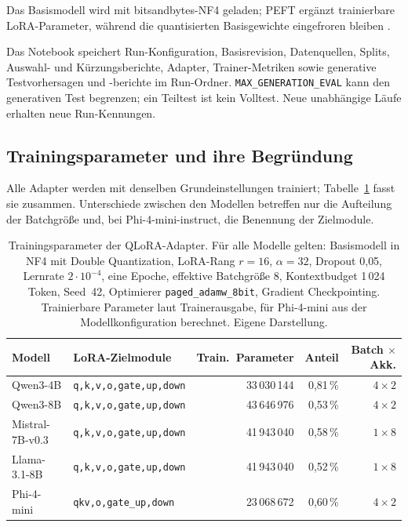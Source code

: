 \documentclass[12pt,twoside=false,a4paper,parskip]{scrbook}
\begin{document}
Das Basismodell wird mit bitsandbytes-NF4 geladen; PEFT ergänzt trainierbare LoRA-Parameter, während die quantisierten Basisgewichte eingefroren bleiben \cite{hu2021lora,dettmers2023qlora}.

Das Notebook speichert Run-Konfiguration, Basisrevision, Datenquellen, Splits, Auswahl- und Kürzungsberichte, Adapter, Trainer-Metriken sowie generative Testvorhersagen und -berichte im Run-Ordner. \texttt{MAX\_GENERATION\_EVAL} kann den generativen Test begrenzen; ein Teiltest ist kein Volltest. Neue unabhängige Läufe erhalten neue Run-Kennungen.

\subsection{Trainingsparameter und ihre Begründung}\label{sec:trainingsparameter}

Alle Adapter werden mit denselben Grundeinstellungen trainiert; Tabelle~\ref{tab:trainingsparameter} fasst sie zusammen. Unterschiede zwischen den Modellen betreffen nur die Aufteilung der Batchgröße und, bei Phi-4-mini-instruct, die Benennung der Zielmodule.

\begin{table}[htbp]
\centering\small
\caption[Trainingsparameter der QLoRA-Adapter]{Trainingsparameter der QLoRA-Adapter. Für alle Modelle gelten: Basismodell in NF4 mit Double Quantization, LoRA-Rang $r=16$, $\alpha=32$, Dropout 0{,}05, Lernrate $2\cdot10^{-4}$, eine Epoche, effektive Batchgröße 8, Kontextbudget 1\,024 Token, Seed~42, Optimierer \texttt{paged\_adamw\_8bit}, Gradient Checkpointing. Trainierbare Parameter laut Trainerausgabe, für Phi-4-mini aus der Modellkonfiguration berechnet. Eigene Darstellung.}
\label{tab:trainingsparameter}
\begin{tabular}{lp{.27\linewidth}rrr}
\toprule
Modell & LoRA-Zielmodule & Train.\ Parameter & Anteil & Batch $\times$ Akk. \\
\midrule
Qwen3-4B & \texttt{q,k,v,o,gate,up,down} & 33\,030\,144 & 0{,}81\,\% & $4\times2$ \\
Qwen3-8B & \texttt{q,k,v,o,gate,up,down} & 43\,646\,976 & 0{,}53\,\% & $4\times2$ \\
Mistral-7B-v0.3 & \texttt{q,k,v,o,gate,up,down} & 41\,943\,040 & 0{,}58\,\% & $1\times8$ \\
Llama-3.1-8B & \texttt{q,k,v,o,gate,up,down} & 41\,943\,040 & 0{,}52\,\% & $1\times8$ \\
Phi-4-mini & \texttt{qkv,o,gate\_up,down} & 23\,068\,672 & 0{,}60\,\% & $4\times2$ \\
\bottomrule
\end{tabular}
\end{table}
\end{document}
